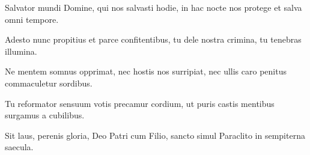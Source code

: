 Salvator mundi Domine,
qui nos salvasti hodie,
in hac nocte nos protege
et salva omni tempore.

Adesto nunc propitius
et parce confitentibus,
tu dele nostra crimina,
tu tenebras illumina.

Ne mentem somnus opprimat,
nec hostis nos surripiat,
nec ullis caro penitus
commaculetur sordibus.

Tu reformator sensuum
votis precamur cordium,
ut puris castis mentibus
surgamus a cubilibus.

Sit laus, perenis gloria,
Deo Patri cum Filio,
sancto simul Paraclito
in sempiterna saecula.

